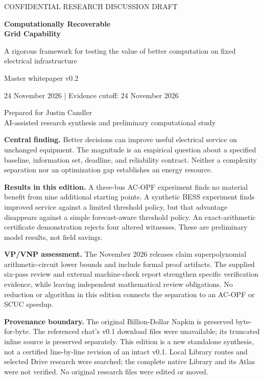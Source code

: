 \documentclass[11pt,letterpaper]{article}
\begin{document}
\hypersetup{pageanchor=false}\begin{titlepage}
{\large CONFIDENTIAL RESEARCH DISCUSSION DRAFT\par}\vspace{1.3cm}
{\Huge\bfseries Computationally Recoverable\\[5pt] Grid Capability\par}\vspace{0.7cm}
{\LARGE A rigorous framework for testing the value of better computation on fixed electrical infrastructure\par}\vspace{0.7cm}
{\Large Master whitepaper v0.2\par}
24 November 2026 \quad | \quad Evidence cutoff: 24 November 2026
\vspace{0.8cm}

Prepared for Justin Candler\\AI-assisted research synthesis and preliminary computational study
\vspace{0.7cm}

\textbf{Central finding.} Better decisions can improve useful electrical service on unchanged equipment. The magnitude is an empirical question about a specified baseline, information set, deadline, and reliability contract. Neither a complexity separation nor an optimization gap establishes an energy resource.

\textbf{Results in this edition.} A three-bus AC-OPF experiment finds no material benefit from nine additional starting points. A synthetic BESS experiment finds improved service against a limited threshold policy, but that advantage disappears against a simple forecast-aware threshold policy. An exact-arithmetic certificate demonstration rejects four altered witnesses. These are preliminary model results, not field savings.

\textbf{VP/VNP assessment.} The November 2026 releases claim superpolynomial arithmetic-circuit lower bounds and include formal proof artifacts. The supplied six-pass review and external machine-check report strengthen specific verification evidence, while leaving independent mathematical review obligations. No reduction or algorithm in this edition connects the separation to an AC-OPF or SCUC speedup.

\vfill
\textbf{Provenance boundary.} The original Billion-Dollar Napkin is preserved byte-for-byte. The referenced chat's v0.1 download files were unavailable; its truncated inline source is preserved separately. This edition is a new standalone synthesis, not a certified line-by-line revision of an intact v0.1. Local Library routes and selected Drive research were searched; the complete native Library and its Atlas were not verified. No original research files were edited or moved.
\end{titlepage}\hypersetup{pageanchor=true}
\end{document}
